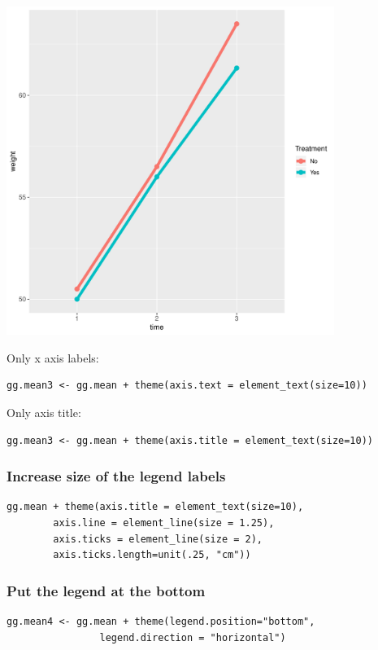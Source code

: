 \documentclass{article}
\begin{document}
\begin{center}
\includegraphics[width=0.8\textwidth]{./figures/fig-meanTime3.pdf}
\end{center}

Only x axis labels:
\lstset{language=r,label= ,caption= ,captionpos=b,numbers=none}
\begin{lstlisting}
gg.mean3 <- gg.mean + theme(axis.text = element_text(size=10))
\end{lstlisting}

Only axis title:
\lstset{language=r,label= ,caption= ,captionpos=b,numbers=none}
\begin{lstlisting}
gg.mean3 <- gg.mean + theme(axis.title = element_text(size=10))
\end{lstlisting}

\clearpage
\subsubsection{Increase size of the legend labels}
\label{sec:orge634c0e}
\lstset{language=r,label= ,caption= ,captionpos=b,numbers=none}
\begin{lstlisting}
gg.mean + theme(axis.title = element_text(size=10), 
		axis.line = element_line(size = 1.25),
		axis.ticks = element_line(size = 2),
		axis.ticks.length=unit(.25, "cm"))
\end{lstlisting}

\subsubsection{Put the legend at the bottom}
\label{sec:org8e6c842}
\lstset{language=r,label= ,caption= ,captionpos=b,numbers=none}
\begin{lstlisting}
gg.mean4 <- gg.mean + theme(legend.position="bottom",
			    legend.direction = "horizontal")
\end{lstlisting}
\end{document}
